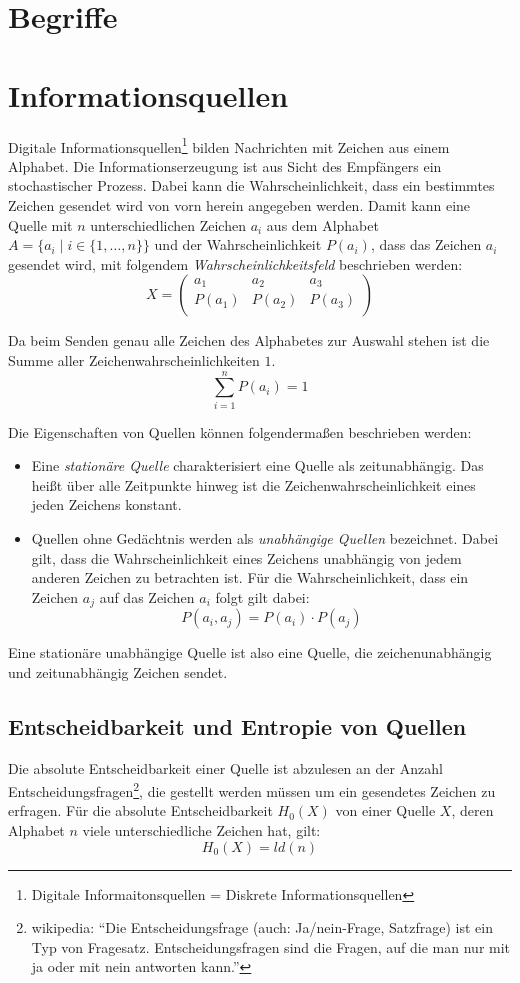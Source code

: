 \section{Begriffe}

\section{Informationsquellen}
Digitale Informationsquellen\footnote{Digitale Informaitonsquellen = Diskrete Informationsquellen} bilden Nachrichten mit Zeichen aus einem Alphabet. Die Informationserzeugung ist aus Sicht des Empfängers ein stochastischer Prozess. Dabei kann die Wahrscheinlichkeit, dass ein bestimmtes Zeichen gesendet wird von vorn herein angegeben werden. Damit kann eine Quelle mit $n$ unterschiedlichen Zeichen $a_i$ aus dem Alphabet $A = \{a_i \mid i \in \{1, \ldots, n\}\}$ und der Wahrscheinlichkeit $P(a_i)$, dass das Zeichen $a_i$ gesendet wird, mit folgendem \textit{Wahrscheinlichkeitsfeld} beschrieben werden:
$$
	X =
	\left(
		\begin{array}{*{4}{c}}
		  a_1    &  a_2   &  a_3   \\
		  P(a_1) & P(a_2) & P(a_3) \\
		\end{array}
	\right)
$$

Da beim Senden genau alle Zeichen des Alphabetes zur Auswahl stehen ist die Summe aller Zeichenwahrscheinlichkeiten $1$.
$$
	\sum_{i=1}^n P(a_i) = 1
$$

Die Eigenschaften von Quellen können folgendermaßen beschrieben werden:
\begin{itemize}
  \item Eine \textit{stationäre Quelle} charakterisiert eine Quelle als zeitunabhängig. Das heißt über alle Zeitpunkte hinweg ist die Zeichenwahrscheinlichkeit eines jeden Zeichens konstant.
	\item Quellen ohne Gedächtnis werden als \emph{unabhängige Quellen} bezeichnet. Dabei gilt, dass die Wahrscheinlichkeit eines Zeichens unabhängig von jedem anderen Zeichen zu betrachten ist. Für die Wahrscheinlichkeit, dass ein Zeichen $a_j$ auf das Zeichen $a_i$ folgt gilt dabei:
$$ P(a_i, a_j) = P(a_i) \cdot P(a_j) $$
\end{itemize}
Eine stationäre unabhängige Quelle ist also eine Quelle, die zeichenunabhängig und zeitunabhängig Zeichen sendet.


\subsection{Entscheidbarkeit und Entropie von Quellen}
Die absolute Entscheidbarkeit einer Quelle ist abzulesen an der Anzahl Entscheidungsfragen\footnote{wikipedia: "`Die Entscheidungsfrage (auch: Ja/nein-Frage, Satzfrage) ist ein Typ von Fragesatz. Entscheidungsfragen sind die Fragen, auf die man nur mit ja oder mit nein antworten kann."'}, die gestellt werden müssen um ein gesendetes Zeichen zu erfragen. Für die absolute Entscheidbarkeit $H_0(X)$ von einer Quelle $X$, deren Alphabet $n$ viele unterschiedliche Zeichen hat, gilt:
$$ H_0(X) = ld(n) $$

